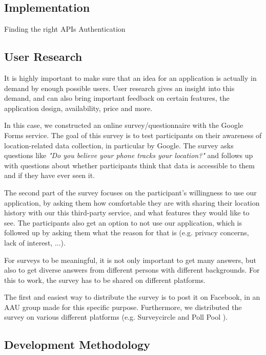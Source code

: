 \documentclass[12p]{article}
\begin{document}
    		\subsection{Implementation}
    		Finding the right APIs
    		Authentication
    		
    		\subsection{User Research}
    		It is highly important to make sure that an idea for an application is actually in demand by enough possible users. User research gives an insight into this demand, and can also bring important feedback on certain features, the application design, availability, price and more.
            
            In this case, we constructed an online survey/questionnaire \cite{Survey} with the Google Forms \cite{GoogleForms} service. The goal of this survey is to test participants on their awareness of location-related data collection, in particular by Google. The survey asks questions like \textit{"Do you believe your phone tracks your location?"} and follows up with questions about whether participants think that data is accessible to them and if they have ever seen it.
            
            The second part of the survey focuses on the participant's willingness to use our application, by asking them how comfortable they are with sharing their location history with our this third-party service, and what features they would like to see. The participants also get an option to not use our application, which is followed up by asking them what the reason for that is (e.g. privacy concerns, lack of interest, ...).
            
            For surveys to be meaningful, it is not only important to get many answers, but also to get diverse answers from different persons with different backgrounds. For this to work, the survey has to be shared on different platforms.
            
            The first and easiest way to distribute the survey is to post it on Facebook, in an AAU group made for this specific purpose. Furthermore, we distributed the survey on various different platforms (e.g. Surveycircle \cite{Surveycircle} and Poll Pool \cite{PollPool}).
    		
    		\subsection{Development Methodology}
    		
\end{document}
